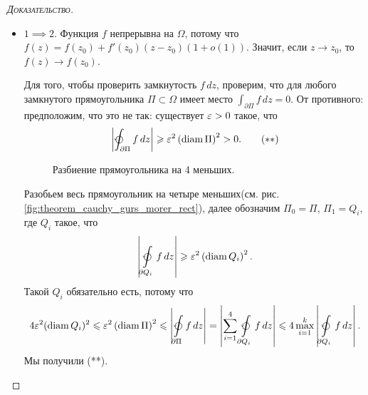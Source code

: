 \documentclass[../complex-analysis.tex]{subfiles}
\begin{document}
\begin{proof}[\normalfont\textsc{Доказательство}]\
 \begin{itemize}
  \item $1 \implies 2$. Функция $f$ непрерывна на $\Omega$, потому что $f(z) = f(z_0) + f'(z_0)(z-z_0)(1+o(1))$. Значит, если $z \to z_0$, то $f(z) \to f(z_0)$.

 Для того, чтобы проверить замкнутость $f \, dz$, проверим, что для любого замкнутого прямоугольника $\Pi \subset \Omega$ имеет место $\int_{\partial\Pi} f\,dz =0 $. От противного: предположим, что это не так: существует $\varepsilon > 0$ такое, что 
\begin{align*}
 \left|\varointctrclockwise_{\partial\Pi} f\,dz  \right|  \geqslant \eps^{2}\left( \diam \Pi \right)^{2} > 0. \qquad ( \ast\ast )
\end{align*}
\begin{figure}[ht]
    \centering
    \caption{Разбиение прямоугольника на 4 меньших.}
    \label{fig:theorem_cauchy_gurs_morer_rect}
\end{figure}

 Разобьем весь прямоугольник на четыре меньших(см. рис. \eqref{fig:theorem_cauchy_gurs_morer_rect}), далее обозначим $\Pi_0 = \Pi$, $\Pi_1 = Q_i$, где $Q_i$ такое, что 
 \begin{align*}
  \left| \varointctrclockwise\limits_{\partial Q_i}  f\,dz \right| \geqslant \eps^{2} \left( \diam Q_i \right)^{2}.
 \end{align*} Такой $Q_i$ обязательно есть, потому что
 \begin{align*}
  4\eps^{2}(\diam Q_i)^{2} \leqslant \eps^{2} \left( \diam \Pi \right)^{2} \leqslant \left| \varointctrclockwise\limits_{\partial \Pi} f\,dz   \right| = \left| \sum_{i=1}^{4} \varointctrclockwise\limits_{\partial Q_i} f\,dz    \right| \leqslant 4 \max_{i=1}^{k} \left| \varointctrclockwise\limits_{\partial Q_i} f\,dz   \right|.
 \end{align*} Мы получили (**).


\end{itemize}
\end{proof}
\end{document}
